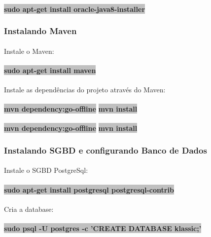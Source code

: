 \documentclass[	DIV=calc,%
							paper=a4,%
							fontsize=12pt,%
							onecolumn]{scrartcl}	 					%
\begin{document}
\paragraph{}
\textbf{\colorbox{Silver}{sudo apt-get install oracle-java8-installer}}
\subsubsection{Instalando Maven}
\paragraph{}
Instale o Maven:
\paragraph{}
\textbf{\colorbox{Silver}{sudo apt-get install maven}}
\paragraph{}
Instale as dependências do projeto através do Maven:
\paragraph{}
\textbf{\colorbox{Silver}{mvn dependency:go-offline}}
\textbf{\colorbox{Silver}{mvn install}}
\paragraph{}
\textbf{\colorbox{Silver}{mvn dependency:go-offline}}
\textbf{\colorbox{Silver}{mvn install}}
\subsubsection{Instalando SGBD e configurando Banco de Dados}
\paragraph{}
Instale o SGBD PostgreSql:
\paragraph{}
\textbf{\colorbox{Silver}{sudo apt-get install postgresql postgresql-contrib}}
\paragraph{}
Cria a database:
\paragraph{}
\textbf{\colorbox{Silver}{sudo psql -U postgres -c ’CREATE DATABASE klassic;’}}
\end{document}
